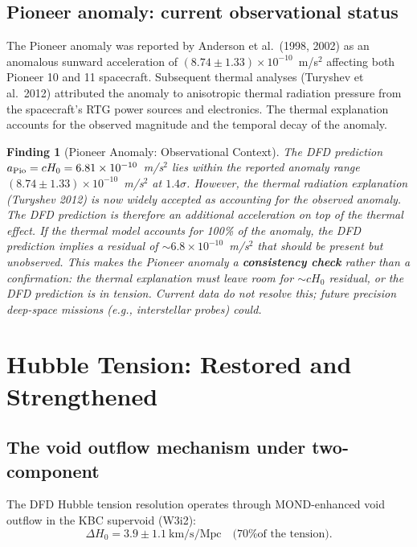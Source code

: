 \documentclass[11pt]{article}
\newtheorem{finding}{Finding}
\newcommand{\ee}[1]{\times 10^{#1}}
\newcommand{\Hzero}{H_0}
\begin{document}
\subsection{Pioneer anomaly: current observational status}

The Pioneer anomaly was reported by Anderson et al.\ (1998, 2002) as
an anomalous sunward acceleration of $(8.74 \pm 1.33)\ee{-10}$~m/s$^2$
affecting both Pioneer 10 and 11 spacecraft. Subsequent thermal analyses
(Turyshev et al.\ 2012) attributed the anomaly to anisotropic thermal
radiation pressure from the spacecraft's RTG power sources and electronics.
The thermal explanation accounts for the observed magnitude and the
temporal decay of the anomaly.

\begin{finding}[Pioneer Anomaly: Observational Context]
\label{find:Pioneer-obs}
The DFD prediction $a_{\rm Pio} = c\Hzero = 6.81\ee{-10}$~m/s$^2$ lies
within the reported anomaly range $(8.74 \pm 1.33)\ee{-10}$~m/s$^2$
at $1.4\sigma$. However, the thermal radiation explanation (Turyshev 2012)
is now widely accepted as accounting for the observed anomaly. The DFD
prediction is therefore an \emph{additional} acceleration on top of the
thermal effect. If the thermal model accounts for 100\% of the anomaly,
the DFD prediction implies a residual of $\sim 6.8\ee{-10}$~m/s$^2$
that should be present but unobserved. This makes the Pioneer anomaly
a \textbf{consistency check} rather than a confirmation: the thermal
explanation must leave room for $\sim c\Hzero$ residual, or the DFD
prediction is in tension. Current data do not resolve this; future
precision deep-space missions (e.g., interstellar probes) could.
\end{finding}

\section{Hubble Tension: Restored and Strengthened}
\label{sec:Hubble-restored}

\subsection{The void outflow mechanism under two-component}

The DFD Hubble tension resolution operates through MOND-enhanced void
outflow in the KBC supervoid (W3i2):
\begin{equation}
\Delta\Hzero = 3.9 \pm 1.1~\text{km/s/Mpc}
\quad\text{(70\% of the tension).}
\end{equation}
\end{document}
